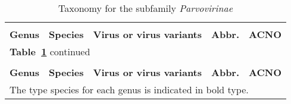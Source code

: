   








 



\clearpage



\begin{tiny}
\begin{center}

\begin{longtable}{p{0.7in} p{1.65in} p{1.6in} p{0.6in} p{0.65in}}
\caption[Taxonomy for the subfamily \textit{Parvovirinae}]{Taxonomy for the subfamily \textit{Parvovirinae}}\\
\\
\label{Tab: Taxonomy}
\textbf{Genus} & \textbf{Species} & \textbf{Virus or virus variants} & \textbf{Abbr.} & \textbf{ACNO}\footnotemark\\
\hline
\endfirsthead %


\multicolumn{3}{l}{\textbf{Table~\ref{Tab: Taxonomy}} continued}\\
\\
\textbf{Genus} & \textbf{Species} & \textbf{Virus or virus variants} & \textbf{Abbr.} & \textbf{ACNO}\footnotemark\\
\hline
\endhead

\hline
\multicolumn{5}{l}{The type species for each genus is indicated in bold type. \cite{pmid24212889}}
\endlastfoot


\end{longtable}
\end{center}
\end{tiny}
